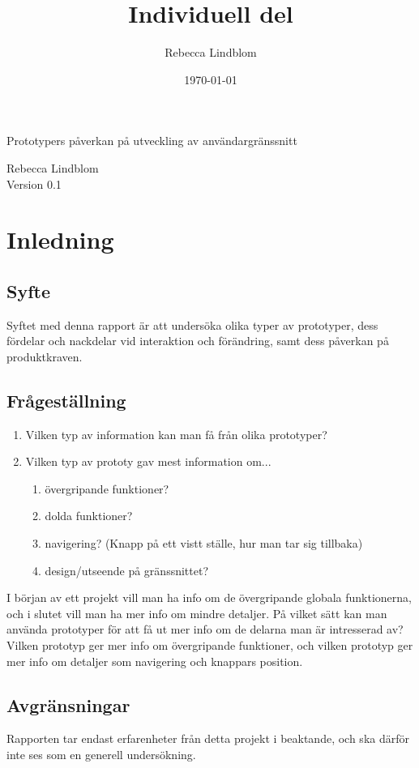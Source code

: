 \documentclass{article}
\title{Individuell del}
\author{Rebecca Lindblom}
\date{\today}
\begin{document}
\thispagestyle{empty}

{
\sffamily
\centering
\large


{\huge 
Prototypers påverkan på utveckling av användargränssnitt
}

{\large
Rebecca Lindblom\\
Version 0.1\\
}
}

\clearpage

\renewcommand*\contentsname{Innehållsförteckning}
\tableofcontents
\clearpage

\clearpage
\section{Inledning}


\subsection{Syfte}
Syftet med denna rapport är att undersöka olika typer av prototyper, dess fördelar och nackdelar vid interaktion och förändring, samt dess påverkan på produktkraven. 

\subsection{Frågeställning}
\begin{enumerate}
    \item Vilken typ av information kan man få från olika prototyper?
    \item Vilken typ av prototy gav mest information om...
    \begin{enumerate}
    \item övergripande funktioner?
    \item dolda funktioner?
    \item navigering? (Knapp på ett vistt ställe, hur man tar sig tillbaka)
    \item design/utseende på gränssnittet?
    \end{enumerate}
\end{enumerate}
I början av ett projekt vill man ha info om de övergripande globala funktionerna, och i slutet vill man ha mer info om mindre detaljer. På vilket sätt kan man använda prototyper för att få ut mer info om de delarna man är intresserad av? Vilken prototyp ger mer info om övergripande funktioner, och vilken prototyp ger mer info om detaljer som navigering och knappars position.

\subsection{Avgränsningar}
Rapporten tar endast erfarenheter från detta projekt i beaktande, och ska därför inte ses som en generell undersökning. 
\end{document}
